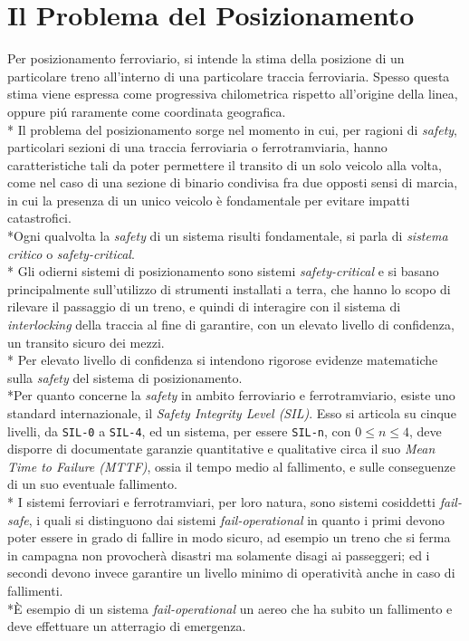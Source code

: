 \section{Il Problema del Posizionamento}
Per posizionamento ferroviario, si intende la stima della posizione di un particolare treno all'interno di una particolare traccia ferroviaria. Spesso questa stima viene espressa come progressiva chilometrica rispetto all'origine della linea, oppure pi\'u raramente come coordinata geografica.\\*
Il problema del posizionamento sorge nel momento in cui, per ragioni di \emph{safety}, particolari sezioni di una traccia ferroviaria o ferrotramviaria, hanno caratteristiche tali da poter permettere il transito di un solo veicolo alla volta, come nel caso di una sezione di binario condivisa fra due opposti sensi di marcia, in cui la presenza di un unico veicolo \`e fondamentale per evitare impatti catastrofici.\\*Ogni qualvolta la \emph{safety} di un sistema risulti fondamentale, si parla di \emph{sistema critico} o \emph{safety-critical}.\\*
Gli odierni sistemi di posizionamento sono sistemi \emph{safety-critical} e si basano principalmente sull'utilizzo di strumenti installati a terra, che hanno lo scopo di rilevare il passaggio di un treno, e quindi di interagire con il sistema di \emph{interlocking} della traccia al fine di garantire, con un elevato livello di confidenza, un transito sicuro dei mezzi.\\*
Per elevato livello di confidenza si intendono rigorose evidenze matematiche sulla \emph{safety} del sistema di posizionamento.\\*Per quanto concerne la \emph{safety} in ambito ferroviario e ferrotramviario, esiste uno standard internazionale, il \emph{Safety Integrity Level (SIL)}. Esso si articola su cinque livelli, da \texttt{SIL-0} a \texttt{SIL-4}, ed un sistema, per essere \texttt{SIL-n}, con $0\le n\le 4$, deve disporre di documentate garanzie quantitative e qualitative circa il suo \emph{Mean Time to Failure (MTTF)}, ossia il tempo medio al fallimento, e sulle conseguenze di un suo eventuale fallimento.\\*
I sistemi ferroviari e ferrotramviari, per loro natura, sono sistemi cosiddetti \emph{fail-safe}, i quali si distinguono dai sistemi \emph{fail-operational} in quanto i primi devono poter essere in grado di fallire in modo sicuro, ad esempio un treno che si ferma in campagna non provocher\`a disastri ma solamente disagi ai passeggeri; ed i secondi devono invece garantire un livello minimo di operativit\`a anche in caso di fallimenti.\\*\`E esempio di un sistema \emph{fail-operational} un aereo che ha subito un fallimento e deve effettuare un atterragio di emergenza.
